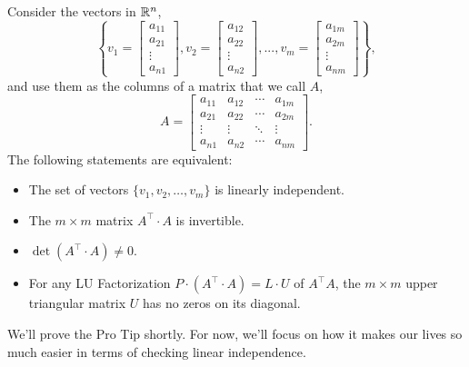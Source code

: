\begin{tcolorbox}[sharp corners, colback=green!30, colframe=green!80!blue,
title=\textbf{Pro-tip! Linear Independence in a Nutshell}]
Consider the vectors in $\mathbb R^n$,
$$\left\{v_1=\begin{bmatrix} a_{11} \\ a_{21}\\ \vdots \\ a_{n1} \end{bmatrix},  v_2=\begin{bmatrix} a_{12} \\ a_{22}\\ \vdots \\ a_{n2} \end{bmatrix}, ...,  v_m=\begin{bmatrix} a_{1m} \\ a_{2m}\\ \vdots \\ a_{nm} \end{bmatrix} \right\},$$ 
and use them as the columns of a matrix that we call $A$,
\begin{equation}
\label{eq:MatrixFromLinearIndependence_proTipC}    
A=\left[\begin{array}{cccc} a_{11}& a_{12}& \cdots & a_{1m} \\
 a_{21}& a_{22}& \cdots & a_{2m}  \\
 \vdots & \vdots&  \ddots & \vdots \\
 a_{n1}& a_{n2}& \cdots & a_{nm} 
 \end{array}\right].
 \end{equation}
 The following statements are equivalent:
 \begin{itemize}
     \item  The set of vectors $ \{v_1, v_2, \ldots, v_m \} $ is linearly independent.
     \item The $m \times m$ matrix $A^\top \cdot A$ is invertible. 
     \item $\det(A^\top \cdot A) \neq 0$.
     \item For any LU Factorization $P \cdot (A^\top \cdot A) = L \cdot U$  of $A^\top A$, the $m \times m$ upper triangular matrix $U$ has no zeros on its diagonal.
 \end{itemize}
 
We'll prove the Pro Tip shortly. For now, we'll focus on how it makes our lives so much easier in terms of checking linear independence.
\end{tcolorbox}

